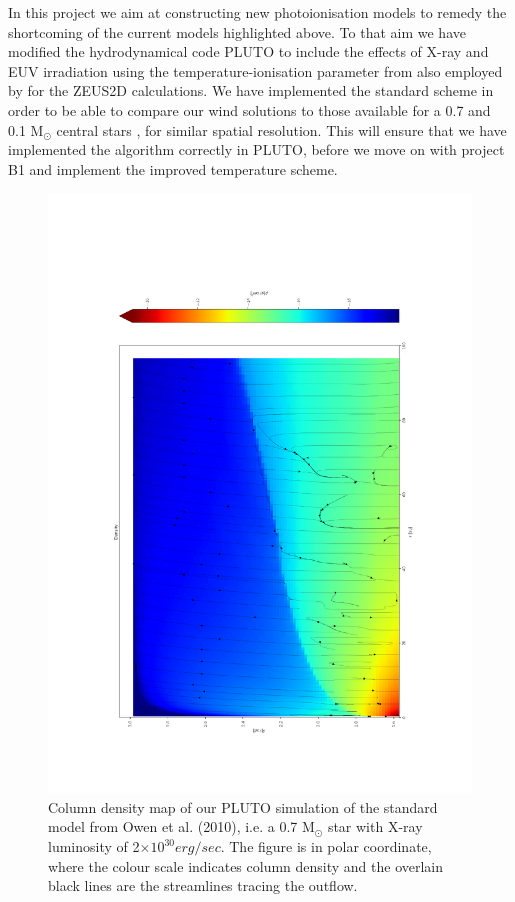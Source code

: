 \documentclass[10pt,fleqn,twoside]{article}
\begin{document}
In this project we aim at constructing new photoionisation models to
remedy the shortcoming of the current models highlighted above. To
that aim we have modified the hydrodynamical code PLUTO 
\citep{2007ApJS..170..228M, 2012A&A...545A.152M}
to include the
effects of X-ray and EUV irradiation using the temperature-ionisation
parameter from 
\citet{2008ApJ...688..398E, 2009ApJ...699.1639E}
also employed by 
\citet{2010MNRAS.401.1415O}
for the ZEUS2D calculations. We have implemented the
standard scheme in order to be able to compare our wind solutions to 
those available for a 0.7 and 0.1 M$_\odot$ central
stars 
\citep{2010MNRAS.401.1415O, 2011MNRAS.412...13O, 2012MNRAS.422.1880O},
for similar spatial
resolution. This will ensure that we have implemented the algorithm
correctly in PLUTO, before we move on with project B1 and implement
the improved temperature scheme. 



\begin{figure}
  \includegraphics[width=0.85\linewidth, angle = 270]{dens0604.pdf}
  \caption{Column density map of our PLUTO simulation of the standard
    model from Owen et al. (2010), i.e. a 0.7 M$_{\odot}$ star with
X-ray luminosity of 2$\times 10^{30} erg/sec$. The figure is in polar coordinate,
    where the colour scale indicates column density and the overlain
    black lines are the streamlines tracing the outflow. }
  \label{fig:streamlines}
\end{figure}
\end{document}
